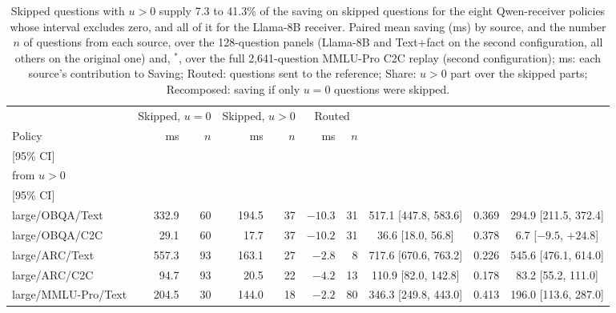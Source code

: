 \begin{table}[!htbp]\centering\scriptsize
\caption{Skipped questions with $u>0$ supply 7.3 to 41.3\% of the saving on skipped questions for the eight Qwen-receiver policies whose interval excludes zero, and all of it for the Llama-8B receiver. Paired mean saving (ms) by source, and the number $n$ of questions from each source, over the 128-question panels (Llama-8B and Text+fact on the second configuration, all others on the original one) and, $^\ast$, over the full 2,641-question MMLU-Pro C2C replay (second configuration); ms: each source's contribution to Saving; Routed: questions sent to the reference; Share: $u>0$ part over the skipped parts; Recomposed: saving if only $u=0$ questions were skipped.}
\label{tab:u0saving}
\renewcommand{\arraystretch}{1.1}\setlength{\tabcolsep}{2pt}
\begin{tabular*}{\linewidth}{@{}l@{\hspace{5pt}\extracolsep{\fill}}rrrrrrcrc@{}}\toprule
& \multicolumn{2}{c}{Skipped, $u=0$} & \multicolumn{2}{c}{Skipped, $u>0$} & \multicolumn{2}{c}{Routed} & & & \\\cmidrule(lr){2-3}\cmidrule(lr){4-5}\cmidrule(lr){6-7}
Policy & ms & $n$ & ms & $n$ & ms & $n$ & \begin{tabular}[b]{@{}c@{}}Saving (ms)\\{}[95\% CI]\end{tabular} & \begin{tabular}[b]{@{}c@{}}Share\\from $u>0$\end{tabular} & \begin{tabular}[b]{@{}c@{}}Recomposed (ms)\\{}[95\% CI]\end{tabular}\\\midrule
large/OBQA/Text & 332.9 & 60 & 194.5 & 37 & $-10.3$ & 31 & 517.1 [447.8, 583.6] & 0.369 & 294.9 [211.5, 372.4]\\
large/OBQA/C2C & 29.1 & 60 & 17.7 & 37 & $-10.2$ & 31 & 36.6 [18.0, 56.8] & 0.378 & 6.7 [$-9.5$, $+24.8$]\\
large/ARC/Text & 557.3 & 93 & 163.1 & 27 & $-2.8$ & 8 & 717.6 [670.6, 763.2] & 0.226 & 545.6 [476.1, 614.0]\\
large/ARC/C2C & 94.7 & 93 & 20.5 & 22 & $-4.2$ & 13 & 110.9 [82.0, 142.8] & 0.178 & 83.2 [55.2, 111.0]\\
large/MMLU-Pro/Text & 204.5 & 30 & 144.0 & 18 & $-2.2$ & 80 & 346.3 [249.8, 443.0] & 0.413 & 196.0 [113.6, 287.0]\\

\end{tabular*}
\end{table}
